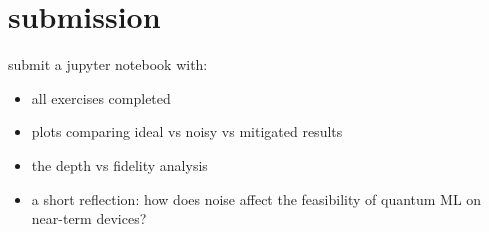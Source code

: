 \documentclass[11pt,a4paper]{article}
\theoremstyle{definition}
\theoremstyle{remark}
\newcounter{exercise}[section]
\begin{document}
\section{submission}

submit a jupyter notebook with:
\begin{itemize}[leftmargin=*]
  \item all exercises completed
  \item plots comparing ideal vs noisy vs mitigated results
  \item the depth vs fidelity analysis
  \item a short reflection: how does noise affect the feasibility of quantum ML on near-term devices?
\end{itemize}
\end{document}
